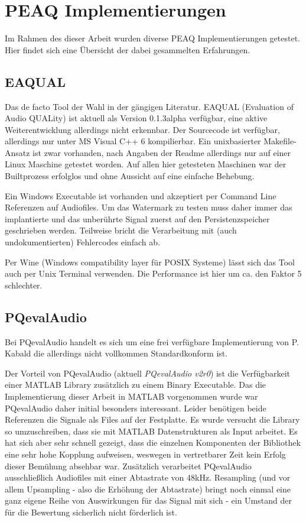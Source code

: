 \chapter{PEAQ Implementierungen}
\label{ch:peaq}

Im Rahmen des dieser Arbeit wurden diverse PEAQ Implementierungen getestet. Hier findet sich eine Übersicht der dabei gesammelten Erfahrungen.

\section{EAQUAL}

Das de facto Tool der Wahl in der gängigen Literatur\cite{xiang2007robust}\cite{kraetzer2006transparency}. EAQUAL (Evaluation of Audio QUALity) ist aktuell als Version 0.1.3alpha verfügbar, eine aktive Weiterentwicklung allerdings nicht erkennbar. Der Sourcecode ist verfügbar, allerdings nur unter MS Visual C++ 6 kompilierbar. Ein unixbasierter Makefile-Ansatz ist zwar vorhanden, nach Angaben der Readme allerdings nur auf einer Linux Maschine getestet worden. Auf allen hier getesteten Maschinen war der Builtprozess erfolglos und ohne Aussicht auf eine einfache Behebung. 

Ein Windows Executable ist vorhanden und akzeptiert per Command Line Referenzen auf Audiofiles. Um das Watermark zu testen muss daher immer das implantierte und das unberührte Signal zuerst auf den Persistenzspeicher geschrieben werden. Teilweise bricht die Verarbeitung mit (auch undokumentierten) Fehlercodes einfach ab.

Per Wine (Windows compatibility layer für POSIX Systeme) lässt sich das Tool auch per Unix Terminal verwenden. Die Performance ist hier um ca. den Faktor 5 schlechter.

\section{PQevalAudio}

Bei PQevalAudio handelt es sich um eine frei verfügbare Implementierung von P. Kabald\cite{kabal2002examination} die allerdings nicht vollkommen Standardkonform ist.

Der Vorteil von PQevalAudio (aktuell \textit{PQevalAudio v2r0}) ist die Verfügbarkeit einer MATLAB Library zusätzlich zu einem Binary Executable. Das die Implementierung dieser Arbeit in MATLAB vorgenommen wurde war PQevalAudio daher initial besonders interessant. Leider benötigen beide Referenzen die Signale als Files auf der Festplatte. Es wurde versucht die Library so umzuschreiben, dass sie mit MATLAB Datenstrukturen als Input arbeitet. Es hat sich aber sehr schnell gezeigt, dass die einzelnen Komponenten der Bibliothek eine sehr hohe Kopplung aufweisen, weswegen in vertretbarer Zeit kein Erfolg dieser Bemühung absehbar war. Zusätzlich verarbeitet PQevalAudio ausschließlich Audiofiles mit einer Abtastrate von 48kHz. Resampling (und vor allem Upsampling - also die Erhöhung der Abtastrate) bringt noch einmal eine ganz eigene Reihe von Auswirkungen für das Signal mit sich - ein Umstand der für die Bewertung sicherlich nicht förderlich ist.


